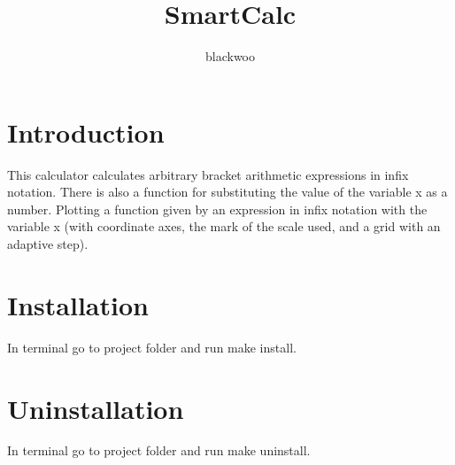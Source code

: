 \documentclass{article}
\title{SmartCalc}
\author{blackwoo}
\begin{document}
\maketitle

\section{Introduction}

This calculator calculates arbitrary bracket arithmetic expressions in infix notation. There is also a function for substituting the value of the variable x as a number.
Plotting a function given by an expression in infix notation with the variable x (with coordinate axes, the mark of the scale used, and a grid with an adaptive step).

\section{Installation}

In terminal go to project folder and run make install.

\section{Uninstallation}

In terminal go to project folder and run make uninstall.
\end{document}
